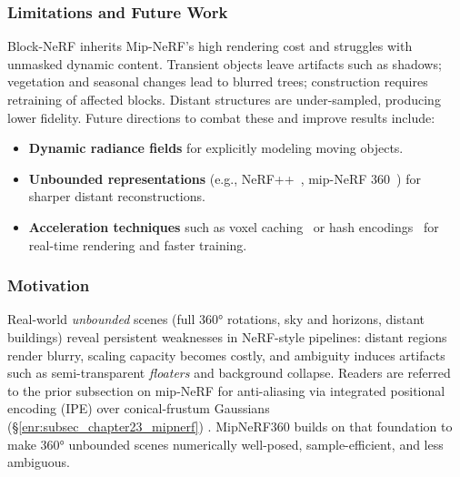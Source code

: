 \begin{enrichment}
\begin{enrichment}
        \subsubsection{Limitations and Future Work}
        \label{subsec:chapter23_blocknerf_limits}
        Block-NeRF inherits Mip-NeRF’s high rendering cost and struggles with unmasked dynamic content. Transient objects leave artifacts such as shadows; vegetation and seasonal changes lead to blurred trees; construction requires retraining of affected blocks. Distant structures are under-sampled, producing lower fidelity. Future directions to combat these and improve results include:
        \begin{itemize}
            \item \textbf{Dynamic radiance fields} for explicitly modeling moving objects.
            \item \textbf{Unbounded representations} (e.g., NeRF++~\cite{zhang2020_nerfplusplus}, mip-NeRF 360~\cite{barron2022_mipnerf360}) for sharper distant reconstructions.
            \item \textbf{Acceleration techniques} such as voxel caching~\cite{liu2020_nsvf,yu2021_plenoctrees} or hash encodings~\cite{mueller2022_instantngp} for real-time rendering and faster training.
        \end{itemize}
        
    \end{enrichment}
    
    \begin{enrichment}
        \label{enr:chapter23_mipnerf360}
        
        \subsubsection{Motivation}
        \label{subsec:chapter23_mipnerf360_motivation}
        Real-world \emph{unbounded} scenes (full 360° rotations, sky and horizons, distant buildings) reveal persistent weaknesses in NeRF-style pipelines: distant regions render blurry, scaling capacity becomes costly, and ambiguity induces artifacts such as semi-transparent \emph{floaters} and background collapse. Readers are referred to the prior subsection on mip-NeRF for anti-aliasing via integrated positional encoding (IPE) over conical-frustum Gaussians (\S\ref{enr:subsec_chapter23_mipnerf}) \cite{barron2021_mipnerf}. MipNeRF360 \cite{barron2022_mipnerf360} builds on that foundation to make 360° unbounded scenes numerically well-posed, sample-efficient, and less ambiguous.
        

\end{enrichment}
\end{enrichment}

